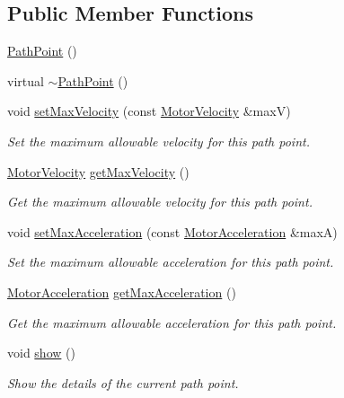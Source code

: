 \subsection*{Public Member Functions}
\begin{DoxyCompactItemize}
\item 
\hyperlink{classPathPoint_a430ccd20bd3aca66d02e5762ada584cc}{Path\-Point} ()
\item 
virtual \hyperlink{classPathPoint_aa1186aedeb2f97861375d70c1f29baef}{$\sim$\-Path\-Point} ()
\item 
void \hyperlink{classPathPoint_af3cc40bbe896d63162c037a57476272f}{set\-Max\-Velocity} (const \hyperlink{classMotorVelocity}{Motor\-Velocity} \&max\-V)
\begin{DoxyCompactList}\small\item\em Set the maximum allowable velocity for this path point. \end{DoxyCompactList}\item 
\hyperlink{classMotorVelocity}{Motor\-Velocity} \hyperlink{classPathPoint_a7e32c122ba0bf4aefcc6684c2d30a69f}{get\-Max\-Velocity} ()
\begin{DoxyCompactList}\small\item\em Get the maximum allowable velocity for this path point. \end{DoxyCompactList}\item 
void \hyperlink{classPathPoint_a2d25367b2e4940967cb7cecda1549896}{set\-Max\-Acceleration} (const \hyperlink{classMotorAcceleration}{Motor\-Acceleration} \&max\-A)
\begin{DoxyCompactList}\small\item\em Set the maximum allowable acceleration for this path point. \end{DoxyCompactList}\item 
\hyperlink{classMotorAcceleration}{Motor\-Acceleration} \hyperlink{classPathPoint_a52f932842709dd6a9213e61252a9c273}{get\-Max\-Acceleration} ()
\begin{DoxyCompactList}\small\item\em Get the maximum allowable acceleration for this path point. \end{DoxyCompactList}\item 
void \hyperlink{classPathPoint_a9dec1d3f21b43b18a4b6daebb1c123de}{show} ()
\begin{DoxyCompactList}\small\item\em Show the details of the current path point. \end{DoxyCompactList}\end{DoxyCompactItemize}
